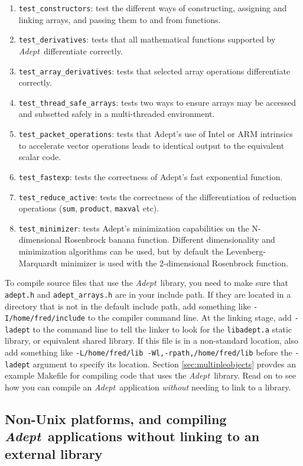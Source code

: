 \documentclass[a4,oneside]{book}
\def\codesize{\small}
\def\Adept{\emph{Adept}}
\def\code#1{{\codesize\texttt{#1}}}
\begin{document}
\begin{enumerate}
\item\code{test\_constructors}: test the different ways of
  constructing, assigning and linking arrays, and passing them to and
  from functions.
\item\code{test\_derivatives}: tests that all mathematical functions
  supported by \Adept\ differentiate correctly.
\item\code{test\_array\_derivatives}: tests that selected array
  operations differentiate correctly.
\item\code{test\_thread\_safe\_arrays}: tests two ways to ensure
  arrays may be accessed and subsetted safely in a multi-threaded
  environment.
\item\code{test\_packet\_operations}: tests that Adept's use of Intel
  or ARM intrinsics to accelerate vector operations leads to identical
  output to the equivalent scalar code.
\item\code{test\_fastexp}: tests the correctness of Adept's fast
  exponential function.
\item\code{test\_reduce\_active}: tests the correctness of the
  differentiation of reduction operations (\code{sum}, \code{product},
  \code{maxval} etc).
\item\code{test\_minimizer}: tests Adept's minimization capabilities
  on the N-dimensional Rosenbrock banana function. Different
  dimensionality and minimization algorithms can be used, but by
  default the Levenberg-Marquardt minimizer is used with the
  2-dimensional Rosenbrock function.
\end{enumerate}

To compile source files that use the \Adept\ library, you need to make
sure that \code{adept.h} and \code{adept\_arrays.h} are in your
include path. If they are located in a directory that is not in the
default include path, add something like \code{-I/home/fred/include}
to the compiler command line. At the linking stage, add \code{-ladept}
to the command line to tell the linker to look for the
\code{libadept.a} static library, or equivalent shared library. If
this file is in a non-standard location, also add something like
\code{-L/home/fred/lib -Wl,-rpath,/home/fred/lib} before the
\code{-ladept} argument to specify its location. Section
\ref{sec:multipleobjects} provdes an example Makefile for compiling
code that uses the \Adept\ library. Read on to see how you can compile
an \Adept\ application \emph{without} needing to link to a library.

\subsection{Non-Unix platforms, and compiling \Adept\ applications
  without linking to an external library}
\label{sec:non-unix}
\end{document}
